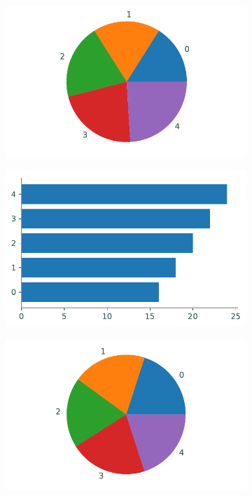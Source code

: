 \begin{figure}[H] %
    \centering
    \begin{subfigure}{.49\textwidth}
        \centering
        \includegraphics[width=\textwidth]{figures/piechart1.pdf}
    \end{subfigure}
    \begin{subfigure}{.49\textwidth}
        \centering
        \includegraphics[width=\textwidth]{figures/piebar1.pdf}
    \end{subfigure}
    \begin{subfigure}{.49\textwidth}
        \centering
        \includegraphics[width=\textwidth]{figures/piechart2.pdf}

\end{subfigure}
\end{figure}
